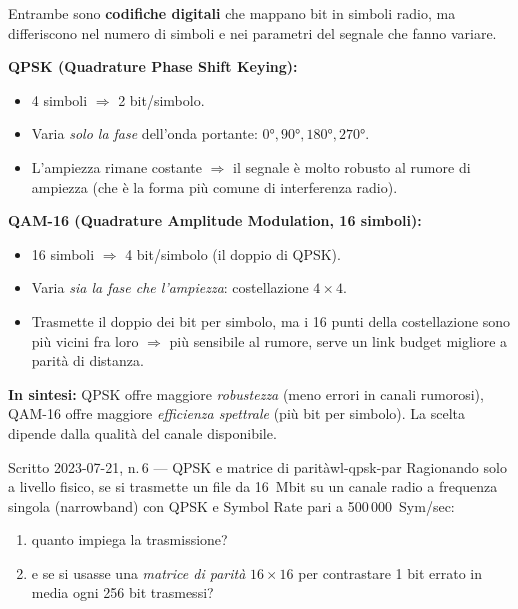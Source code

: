 \documentclass{report}
\begin{document}
\begin{solution}
Entrambe sono \textbf{codifiche digitali} che mappano bit in simboli radio, ma differiscono
nel numero di simboli e nei parametri del segnale che fanno variare.

\medskip
\textbf{QPSK (Quadrature Phase Shift Keying):}
\begin{itemize}
  \item 4 simboli $\Rightarrow$ 2 bit/simbolo.
  \item Varia \emph{solo la fase} dell'onda portante: $0°,90°,180°,270°$.
  \item L'ampiezza rimane costante $\Rightarrow$ il segnale è molto robusto al rumore
        di ampiezza (che è la forma più comune di interferenza radio).
\end{itemize}

\textbf{QAM-16 (Quadrature Amplitude Modulation, 16 simboli):}
\begin{itemize}
  \item 16 simboli $\Rightarrow$ 4 bit/simbolo (il doppio di QPSK).
  \item Varia \emph{sia la fase che l'ampiezza}: costellazione $4\times4$.
  \item Trasmette il doppio dei bit per simbolo, ma i 16 punti della costellazione
        sono più vicini fra loro $\Rightarrow$ più sensibile al rumore, serve un
        link budget migliore a parità di distanza.
\end{itemize}

\textbf{In sintesi:} QPSK offre maggiore \emph{robustezza} (meno errori in canali
rumorosi), QAM-16 offre maggiore \emph{efficienza spettrale} (più bit per simbolo).
La scelta dipende dalla qualità del canale disponibile.
\end{solution}

\begin{Exercise}{Scritto 2023-07-21, n.\,6 --- QPSK e matrice di parità}{wl-qpsk-par}
Ragionando solo a livello fisico, se si trasmette un file da 16~Mbit su un canale
radio a frequenza singola (narrowband) con QPSK e Symbol Rate pari a
500\,000~Sym/sec:
\begin{enumerate}
  \item quanto impiega la trasmissione?
  \item e se si usasse una \emph{matrice di parità} $16\times16$ per contrastare
        1 bit errato in media ogni 256 bit trasmessi?
\end{enumerate}
\end{Exercise}
\end{document}
